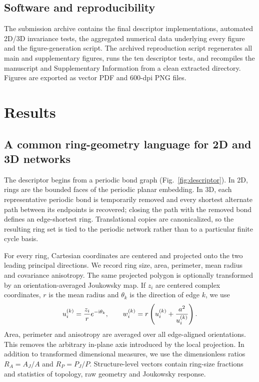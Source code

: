 \documentclass[twoside,twocolumn,9pt]{article}
\begin{document}
\subsection*{Software and reproducibility}

The submission archive contains the final descriptor implementations, automated 2D/3D invariance tests, the aggregated numerical data underlying every figure and the figure-generation script. The archived reproduction script regenerates all main and supplementary figures, runs the ten descriptor tests, and recompiles the manuscript and Supplementary Information from a clean extracted directory. Figures are exported as vector PDF and 600-dpi PNG files.



\section*{Results}

\subsection*{A common ring-geometry language for 2D and 3D networks}

The descriptor begins from a periodic bond graph (Fig.~\ref{fig:descriptor}). In 2D, rings are the bounded faces of the periodic planar embedding. In 3D, each representative periodic bond is temporarily removed and every shortest alternate path between its endpoints is recovered; closing the path with the removed bond defines an edge-shortest ring. Translational copies are canonicalized, so the resulting ring set is tied to the periodic network rather than to a particular finite cycle basis.

For every ring, Cartesian coordinates are centered and projected onto the two leading principal directions. We record ring size, area, perimeter, mean radius and covariance anisotropy. The same projected polygon is optionally transformed by an orientation-averaged Joukowsky map. If \(z_i\) are centered complex coordinates, \(r\) is the mean radius and \(\theta_k\) is the direction of edge \(k\), we use
\begin{equation}
u_i^{(k)}=\frac{z_i}{r}e^{-{\rm i}\theta_k}, \qquad
w_i^{(k)}=r\left(u_i^{(k)}+\frac{a^2}{u_i^{(k)}}\right).
\end{equation}
Area, perimeter and anisotropy are averaged over all edge-aligned orientations. This removes the arbitrary in-plane axis introduced by the local projection. In addition to transformed dimensional measures, we use the dimensionless ratios \(R_A=A_J/A\) and \(R_P=P_J/P\). Structure-level vectors contain ring-size fractions and statistics of topology, raw geometry and Joukowsky response.
\end{document}
